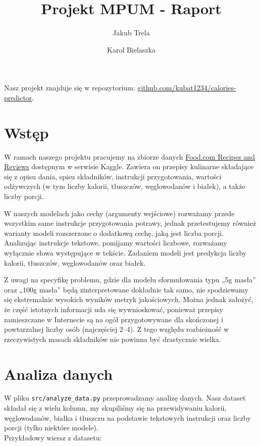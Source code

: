 \documentclass[12pt,a4paper]{article}
\title{Projekt MPUM - Raport}
\author{Jakub Trela \and Karol Bielaszka}
\date{}
\begin{document}
\maketitle

\noindent Nasz projekt znajduje się w repozytorium: \href{https://github.com/kubat1234/calories-predictor}{github.com/kubat1234/calories-predictor}.
\section*{Wstęp}
W ramach naszego projektu pracujemy na zbiorze danych \href{https://www.kaggle.com/datasets/irkaal/foodcom-recipes-and-reviews}{Food.com Recipes and Reviews} dostępnym w serwisie Kaggle. Zawiera on przepisy kulinarne składające się z opisu dania, spisu składników, instrukcji przygotowania, wartości odżywczych (w tym liczby kalorii, tłuszczów, węglowodanów i białek), a także liczby porcji. 

\noindent W naszych modelach jako cechy (argumenty wejściowe) rozważamy przede wszystkim same instrukcje przygotowania potrawy, jednak przetestujemy również warianty modeli rozszerzone o dodatkową cechę, jaką jest liczba porcji. Analizując instrukcje tekstowe, pomijamy wartości liczbowe, rozważamy wyłącznie słowa występujące w tekście. Zadaniem modeli jest predykcja liczby kalorii, tłuszczów, węglowodanów oraz białek. 

\noindent Z uwagi na specyfikę problemu, gdzie dla modelu sformułowania typu „5g masła” oraz „100g masła” będą zinterpretowane dokładnie tak samo, nie spodziewamy się ekstremalnie wysokich wyników metryk jakościowych. Można jednak założyć, że część istotnych informacji uda się wywnioskować, ponieważ przepisy zamieszczane w Internecie są na ogół przygotowywane dla skończonej i powtarzalnej liczby osób (najczęściej 2--4). Z tego względu rozbieżność w rzeczywistych masach składników nie powinna być drastycznie wielka.

\section*{Analiza danych}
W pliku \texttt{src/analyze\_data.py} przeprowadzamy analizę danych. Nasz dataset składał się z wielu kolumn, my skupiliśmy się na przewidywaniu kalorii, węglowodanów, białka i tłuszczu na podstawie tekstowych instrukcji oraz liczby porcji (tylko niektóre modele). \\

\noindent Przykładowy wiersz z datasetu: \\
\end{document}
